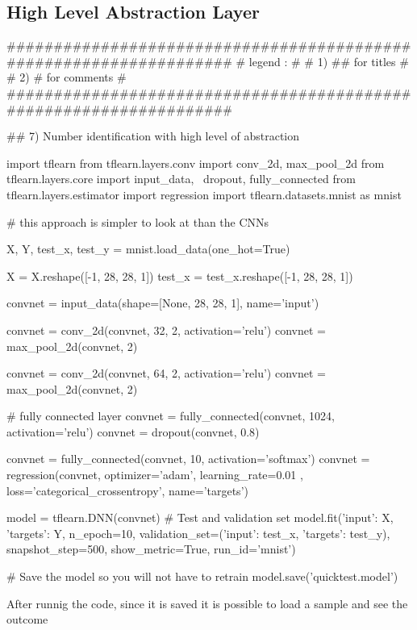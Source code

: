 \documentclass[11pt]{article}
\begin{document}
\subsection{High Level Abstraction Layer}
\begin{python}
###################################################################
# legend :                                                        #
#         1) ## for titles                                        #
#         2) #  for comments                                      #
###################################################################   

## 7) Number identification with high level of abstraction

import tflearn
from tflearn.layers.conv import conv_2d, max_pool_2d
from tflearn.layers.core import input_data, \
    dropout, fully_connected
from tflearn.layers.estimator import regression
import tflearn.datasets.mnist as mnist

# this approach is simpler to look at than the CNNs

X, Y, test_x, test_y = mnist.load_data(one_hot=True)

X = X.reshape([-1, 28, 28, 1])
test_x = test_x.reshape([-1, 28, 28, 1])

convnet = input_data(shape=[None, 28, 28, 1], name='input')

convnet = conv_2d(convnet, 32, 2, activation='relu')
convnet = max_pool_2d(convnet, 2)

convnet = conv_2d(convnet, 64, 2, activation='relu')
convnet = max_pool_2d(convnet, 2)

# fully connected layer
convnet = fully_connected(convnet, 1024, activation='relu')
convnet = dropout(convnet, 0.8)

convnet = fully_connected(convnet, 10, activation='softmax')
convnet = regression(convnet, optimizer='adam', learning_rate=0.01
                     , loss='categorical_crossentropy',
                     name='targets')

model = tflearn.DNN(convnet)
# Test and validation set
model.fit({'input': X}, {'targets': Y}, n_epoch=10,
          validation_set=({'input': test_x}, {'targets': test_y}),
    snapshot_step=500, show_metric=True, run_id='mnist')

# Save the model so you will not have to retrain
model.save('quicktest.model')
\end{python}{}
After runnig the code, since it is saved it is possible to load a sample and see the outcome
\end{document}
